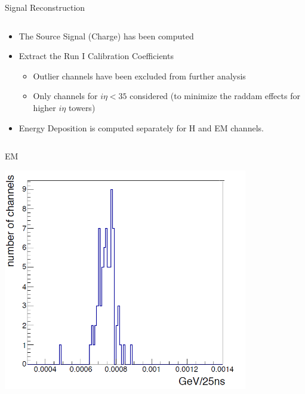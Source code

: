 \documentclass[pdf, 9pt]{beamer}
\begin{document}
  \begin{frame}{Signal Reconstruction}
    \begin{columns}[T]
      \begin{column}{0.7\textwidth}
        \begin{itemize}
          \item The Source Signal (Charge) has been computed
          \item Extract the Run I Calibration Coefficients
            \begin{itemize}
              \item Outlier channels have been excluded from further analysis
              \item Only channels for $i\eta < 35$ considered (to minimize the raddam effects for higher $i\eta$ towers)
            \end{itemize}
          \item Energy Deposition is computed separately for H and EM channels.
        \end{itemize}
        \begin{columns}[T]
          \begin{column}{0.5\textwidth}
            \vspace{0.01cm}
            \begin{center}
              EM
            \end{center}
            \begin{flushright}
              \includegraphics[width=0.8\textwidth, height=0.35\textheight]{figs/sourcing/2013/HFM_2013_Res_EM.png}
            \end{flushright}

\end{column}
\end{columns}
\end{column}
\end{columns}
\end{frame}
\end{document}
